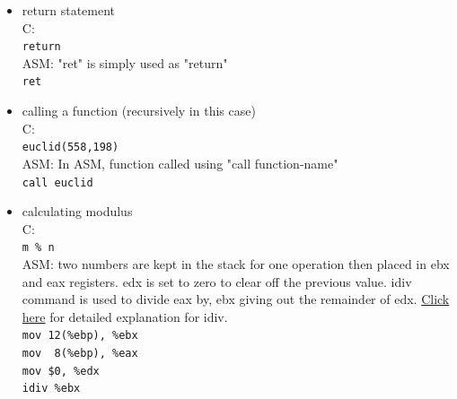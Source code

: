\documentclass{article}
\begin{document}
\begin{itemize}
\item return statement \\
C:\\
\verb|return|\\
ASM: "ret" is simply used as "return"\\
\verb|ret|\\

\item calling a function (recursively in this case) \\
C:\\
\verb|euclid(558,198)|\\
ASM: In ASM, function called using "call function-name"\\
\verb|call euclid|\\

\clearpage
\item calculating modulus \\
C: \\
\verb|m % n|\\
ASM: two numbers are kept in the stack for one operation then placed in ebx and eax registers. edx is set to zero to clear off the previous value. idiv command is used to divide eax by, ebx giving out the remainder of edx. \href{https://goo.gl/h2TVeq}{Click here} for detailed explanation for idiv.\\
\verb|mov 12(%ebp), %ebx|\\
\verb|mov  8(%ebp), %eax|\\
\verb|mov $0, %edx|\\
\verb|idiv %ebx|\\
\end{itemize}
\end{document}
